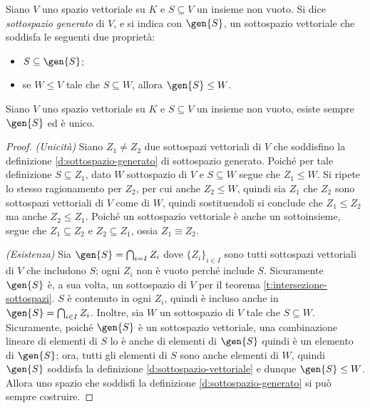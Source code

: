 \begin{definizione} \label{d:sottospazio-generato}
	Siano $V$ uno spazio vettoriale su $K$ e $S\subseteq V$ un insieme non vuoto.
	Si dice \emph{sottospazio generato} di $V$, e si indica con $\gen{S}$, un sottospazio vettoriale che soddisfa le seguenti due proprietà:
	\begin{itemize}
		\item $S\subseteq\gen{S}$;
		\item se $W\leq V$ tale che $S\subseteq W$, allora $\gen{S}\leq W$.
	\end{itemize}
\end{definizione}
\begin{teorema} \label{t:unicità-span}
	Siano $V$ uno spazio vettoriale su $K$ e $S\subseteq V$ un insieme non vuoto, esiste sempre $\gen{S}$ ed è unico.
\end{teorema}
\begin{proof}
	\textit{(Unicità)} Siano $Z_1\neq Z_2$ due sottospazi vettoriali di $V$ che soddisfino la definizione \ref{d:sottospazio-generato} di sottospazio generato.
	Poiché per tale definizione $S\subseteq Z_1$, dato $W$ sottospazio di $V$ e $S\subseteq W$ segue che $Z_1\leq W$.
	Si ripete lo stesso ragionamento per $Z_2$, per cui anche $Z_2\leq W$, quindi sia $Z_1$ che $Z_2$ sono sottospazi vettoriali di $V$ come di $W$, quindi sostituendoli si conclude che $Z_1\leq Z_2$ ma anche $Z_2\leq Z_1$.
	Poiché un sottospazio vettoriale è anche un sottoinsieme, segue che $Z_1\subseteq Z_2$ e $Z_2\subseteq Z_1$, ossia $Z_1\equiv Z_2$.

	\textit{(Esistenza)} Sia $\gen{S}=\bigcap_{i=I}Z_i$ dove $\{Z_i\}_{i\in I}$ sono tutti sottospazi vettoriali di $V$ che includono $S$; ogni $Z_i$ non è vuoto perché include $S$.
	Sicuramente $\gen{S}$ è, a sua volta, un sottospazio di $V$ per il teorema \ref{t:intersezione-sottospazi}.
	$S$ è contenuto in ogni $Z_i$, quindi è incluso anche in $\gen{S}=\bigcap_{i\in I}Z_i$.
	Inoltre, sia $W$ un sottospazio di $V$ tale che $S\subseteq W$.
	Sicuramente, poiché $\gen{S}$ è un sottospazio vettoriale, una combinazione lineare di elementi di $S$ lo è anche di elementi di $\gen{S}$ quindi è un elemento di $\gen{S}$; ora, tutti gli elementi di $S$ sono anche elementi di $W$, quindi $\gen{S}$ soddisfa la definizione \ref{d:sottospazio-vettoriale} e dunque $\gen{S}\leq W$.
	Allora uno spazio che soddisfi la definizione \ref{d:sottospazio-generato} si può sempre costruire.
\end{proof}

